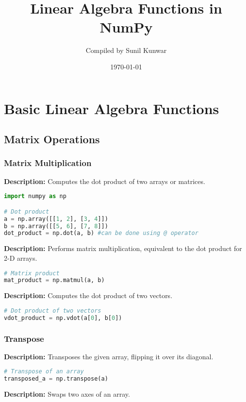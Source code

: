 \documentclass[a4paper, 12pt]{article}
\title{Linear Algebra Functions in NumPy}
\author{Compiled by Sunil Kunwar}
\date{\today}
\begin{document}
\maketitle

\section{Basic Linear Algebra Functions}

\subsection{Matrix Operations}
\subsubsection{Matrix Multiplication}
\textbf{Description:} Computes the dot product of two arrays or matrices.

\begin{lstlisting}[language=Python]
import numpy as np

# Dot product
a = np.array([[1, 2], [3, 4]])
b = np.array([[5, 6], [7, 8]])
dot_product = np.dot(a, b) #can be done using @ operator
\end{lstlisting}

\textbf{Description:} Performs matrix multiplication, equivalent to the dot product for 2-D arrays.

\begin{lstlisting}[language=Python]
# Matrix product
mat_product = np.matmul(a, b)
\end{lstlisting}

\textbf{Description:} Computes the dot product of two vectors.

\begin{lstlisting}[language=Python]
# Dot product of two vectors
vdot_product = np.vdot(a[0], b[0])
\end{lstlisting}

\subsubsection{Transpose}
\textbf{Description:} Transposes the given array, flipping it over its diagonal.

\begin{lstlisting}[language=Python]
# Transpose of an array
transposed_a = np.transpose(a)
\end{lstlisting}

\textbf{Description:} Swaps two axes of an array.
\end{document}
